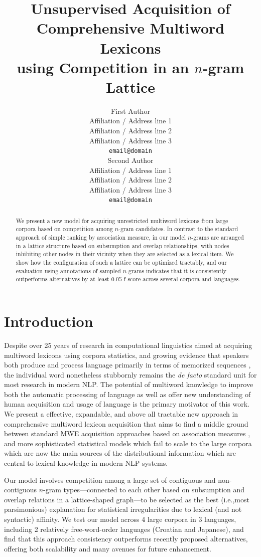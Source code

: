 \documentclass[11pt,letterpaper]{article}
\title{Unsupervised Acquisition of Comprehensive Multiword Lexicons \\ using Competition in an $n$-gram Lattice}
\author{First Author \\
  Affiliation / Address line 1 \\
  Affiliation / Address line 2 \\
  Affiliation / Address line 3 \\
  {\tt email@domain} \\\And
  Second Author \\
  Affiliation / Address line 1 \\
  Affiliation / Address line 2 \\
  Affiliation / Address line 3 \\
  {\tt email@domain} \\}
\date{}
\makeatletter
\def \ie {i.e.,\@ }
\makeatother
\begin{document}
\maketitle
\begin{abstract}

We present a new model for acquiring unrestricted multiword lexicons from large corpora based on  competition among $n$-gram candidates. In contrast to the standard approach of simple ranking by association measure, in our model $n$-grams are arranged in a lattice structure based on subsumption and overlap relationships, with nodes inhibiting other nodes in their vicinity when they are selected as a lexical item. We show how the configuration of such a lattice can be optimized tractably, and our evaluation using annotations of sampled $n$-grams indicates that it is consistently outperforms alternatives by at least 0.05 f-score across several corpora and languages.


\end{abstract}


\section{Introduction}

Despite over 25 years of research in computational linguistics aimed at acquiring multiword lexicons using corpora statistics, and growing evidence that speakers both produce and process language primarily in terms of memorized sequences \cite{Wray08}, the individual word nonetheless stubbornly remains the \textit{de facto} standard unit for most research in modern NLP. The potential of multiword knowledge to improve both the automatic processing of language as well as offer new understanding of human acquisition and usage of language is the primary motivator of this work. We present a effective, expandable, and above all tractable new approach in comprehensive multiword lexicon acquisition that aims to find a middle ground between standard MWE acquisition approaches based on association measures \cite{Ramisch14}, and more sophisticated statistical models \cite{Newman12} which fail to scale to the large corpora which are now the main sources of the distributional information which are central to lexical knowledge in modern NLP systems.

Our model involves competition among a large set of contiguous and non-contiguous $n$-gram types---connected to each other based on subsumption and overlap relations in a lattice-shaped graph---to be selected as the best (\ie most parsimonious) explanation for statistical irregularities due to lexical (and not syntactic) affinity. We test our model across 4 large corpora in 3 languages, including 2 relatively free-word-order languages (Croatian and Japanese), and find that this approach consistency outperforms recently proposed alternatives, offering both scalability and many avenues for future enhancement.
\end{document}
